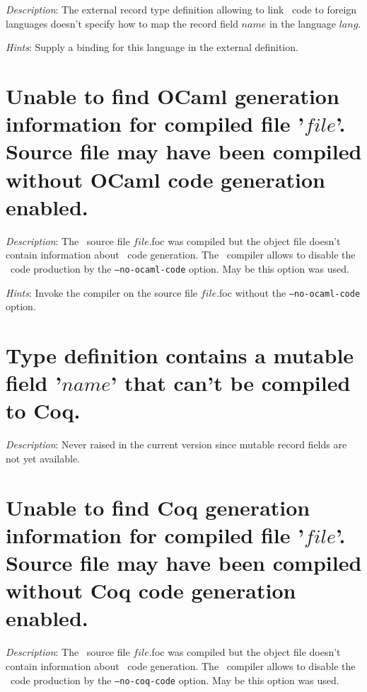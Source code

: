 {\em Description}: The external record type definition allowing to
link \focal\ code to foreign languages doesn't specify how to map the
record field $name$ in the language $lang$.

{\em Hints}: Supply a binding for this language in the external
definition.



\section*{Unable to find OCaml generation information for compiled
  file '$file$'. Source file may have been compiled without OCaml code
  generation enabled.}

{\em Description}: The \focal\ source file $file$.foc was compiled but
the object file doesn't contain information about \ocaml\ code
generation. The \focal\ compiler allows to disable the \ocaml\ code
production by the {\tt --no-ocaml-code} option. May be this option was used.

{\em Hints}: Invoke the compiler on the source file $file$.foc without
the {\tt --no-ocaml-code} option.



\section*{Type definition contains a mutable field '$name$' that can't
  be compiled to Coq.}

{\em Description}: {\color{red} Never raised in the current version
  since mutable record fields are not yet available}.



\section*{Unable to find Coq generation information for compiled file
  '$file$'. Source file may have been compiled without Coq code
  generation enabled.}

{\em Description}: The \focal\ source file $file$.foc was compiled but
the object file doesn't contain information about \coq\ code
generation. The \focal\ compiler allows to disable the \coq\ code
production by the {\tt --no-coq-code} option. May be this option was used.

